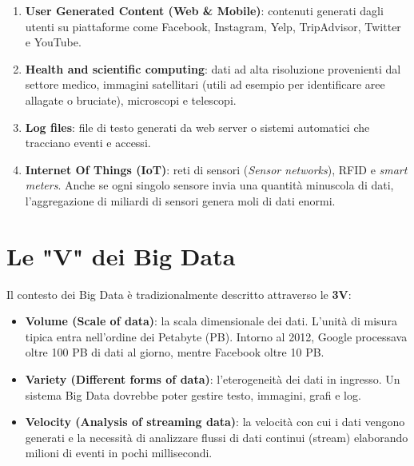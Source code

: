 \begin{enumerate}
    \item \textbf{User Generated Content (Web \& Mobile)}: contenuti generati dagli utenti su piattaforme come Facebook, Instagram, Yelp, TripAdvisor, Twitter e YouTube.
    

    \item \textbf{Health and scientific computing}: dati ad alta risoluzione provenienti dal settore medico, immagini satellitari (utili ad esempio per identificare aree allagate o bruciate), microscopi e telescopi.
    


    \item \textbf{Log files}: file di testo generati da web server o sistemi automatici che tracciano eventi e accessi.
    
    \item \textbf{Internet Of Things (IoT)}: reti di sensori (\textit{Sensor networks}), RFID e \textit{smart meters}. Anche se ogni singolo sensore invia una quantità minuscola di dati, l'aggregazione di miliardi di sensori genera moli di dati enormi.
\end{enumerate}

\section{Le "V" dei Big Data}
Il contesto dei Big Data è tradizionalmente descritto attraverso le \textbf{3V}:
\begin{itemize}
    \item \textbf{Volume (Scale of data)}: la scala dimensionale dei dati. L'unità di misura tipica entra nell'ordine dei Petabyte (PB). Intorno al 2012, Google processava oltre 100 PB di dati al giorno, mentre Facebook oltre 10 PB.
    \item \textbf{Variety (Different forms of data)}: l'eterogeneità dei dati in ingresso. Un sistema Big Data dovrebbe poter gestire testo, immagini, grafi e log.
    \item \textbf{Velocity (Analysis of streaming data)}: la velocità con cui i dati vengono generati e la necessità di analizzare flussi di dati continui (stream) elaborando milioni di eventi in pochi millisecondi.
\end{itemize}

